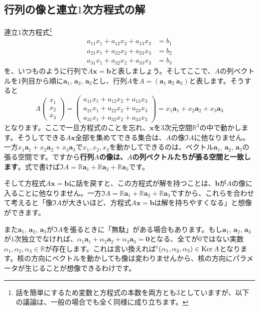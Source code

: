 \subsection{行列の像と連立$1$次方程式の解}

連立$1$次方程式\footnote{話を簡単にするため変数と方程式の本数を両方とも$3$としていますが、以下の議論は、一般の場合でも全く同様に成り立ちます。}
\begin{align*}
a_{11} x_1 + a_{12} x_2 + a_{13} x_3 &= b_1 \\
a_{21} x_1 + a_{22} x_2 + a_{23} x_3 &= b_2 \\
a_{31} x_1 + a_{32} x_2 + a_{33} x_3 &= b_3
\end{align*}
を、いつものように行列で$A\bm{x} = \bm{b}$と表しましょう。そしてここで、$A$の列ベクトルを$1$列目から順に$\bm{a}_1$, $\bm{a}_2$, $\bm{a}_3$とし、行列$A$を$A = ( \bm{a}_1 \ \bm{a}_2 \ \bm{a}_3 )$と表します。そうすると
\[
A
\begin{pmatrix}
x_1 \\
x_2 \\
x_3
\end{pmatrix}
=
\begin{pmatrix}
a_{11} x_1 + a_{12} x_2 + a_{13} x_3 \\
a_{21} x_1 + a_{22} x_2 + a_{23} x_3 \\
a_{31} x_1 + a_{32} x_2 + a_{33} x_3
\end{pmatrix}
= 
x_1 \bm{a}_1 + x_2 \bm{a}_2 + x_3 \bm{a}_3
\]
となります。ここで一旦方程式のことを忘れ、$\bm{x}$を$3$次元空間$\mathbb{R}^3$の中で動かします。そうしてできる$A\bm{x}$全部を集めてできる集合は、$A$の像$\Im A$に他なりません。一方$x_1\bm{a}_1 + x_2 \bm{a}_2 + x_3 \bm{a}_3$で$x_1, x_2, x_3$を動かしてできるのは、ベクトル$\bm{a}_1$, $\bm{a}_2$, $\bm{a}_3$の張る空間です。ですから\textbf{行列$A$の像は、$A$の列ベクトルたちが張る空間と一致します}。式で書けば$\Im A = \mathbb{R}\bm{a}_1 + \mathbb{R}\bm{a}_2 + \mathbb{R}\bm{a}_3$です。

そして方程式$A\bm{x} = \bm{b}$に話を戻すと、この方程式が解を持つことは、$\bm{b}$が$A$の像に入ることに他なりません。一方$\Im A = \mathbb{R}\bm{a}_1 + \mathbb{R}\bm{a}_2 + \mathbb{R}\bm{a}_3$ですから、これらを合わせて考えると「像$\Im A$が大きいほど、方程式$A\bm{x} = \bm{b}$は解を持ちやすくなる」と想像ができます。

また$\bm{a}_1$, $\bm{a}_2$, $\bm{a}_3$が$\Im A$を張るときに「無駄」がある場合もあります。もし$\bm{a}_1$, $\bm{a}_2$, $\bm{a}_3$が$1$次独立でなければ、$\alpha_1 \bm{a}_1 + \alpha_2 \bm{a}_2 + \alpha_3 \bm{a}_3 = \bm{0}$となる、全てが$0$ではない実数$\alpha_1, \alpha_2, \alpha_3 \in\mathbb{R}$が存在します。これは言い換えれば${}^t(\alpha_1, \alpha_2, \alpha_3)\in \operatorname{Ker} A$となります。核の方向にベクトルを動かしても像は変わりませんから、核の方向にパラメータが生じることが想像できるわけです。

